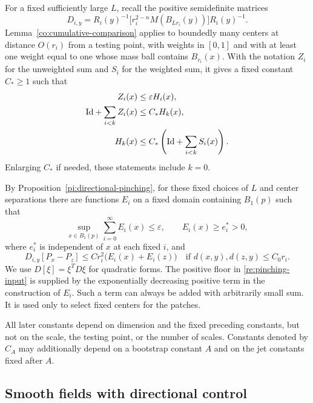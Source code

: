 For a fixed sufficiently large $L$, recall the positive semidefinite
matrices
\begin{equation}
 \label{re:patch-matrix}
 D_{i,y}=R_i(y)^{-1}
       \bigl[r_i^{2-n}M(B_{Lr_i}(y))\bigr]R_i(y)^{-1}.
\end{equation}
Lemma~\ref{co:cumulative-comparison} applies to boundedly many
centers at distance $O(r_i)$ from a testing point, with weights in
$[0,1]$ and with at least one weight equal to one whose mass ball contains
$B_{r_i}(x)$.  With the notation $Z_i$ for the unweighted sum and $S_i$
for the weighted sum, it gives a fixed constant $C_*\ge1$ such that
\begin{equation}
 \label{re:cumulative-input}
 \begin{aligned}
 Z_i(x)&\le\varepsilon H_i(x),\\
 \mathrm{Id}+\sum_{i<k}Z_i(x)&\le C_*H_k(x),\\
 H_k(x)&\le C_*\left(\mathrm{Id}+\sum_{i<k}S_i(x)\right).
 \end{aligned}
\end{equation}
Enlarging $C_*$ if needed, these statements include $k=0$.

By Proposition~\ref{pi:directional-pinching}, for these fixed choices
of $L$ and center separations there are functions $E_i$ on a fixed
domain containing $B_1(p)$ such that
\begin{equation}
 \label{re:pinching-input}
 \sup_{x\in B_1(p)}\sum_{i=0}^\infty E_i(x)\le\varepsilon,
 \qquad E_i(x)\ge e_i^*>0,
\end{equation}
where $e_i^*$ is independent of $x$ at each fixed $i$, and
\begin{equation}
 \label{re:directional-input}
 D_{i,y}[P_x-P_z]
       \le C r_i^2\bigl(E_i(x)+E_i(z)\bigr)
 \quad\text{if }d(x,y),d(z,y)\le C_0r_i.
\end{equation}
We use $D[\xi]=\xi^TD\xi$ for quadratic forms.  The positive floor in
\eqref{re:pinching-input} is supplied by the exponentially decreasing
positive term in the construction of $E_i$.  Such a term can always
be added with arbitrarily small sum.  It is used only to select fixed
centers for the patches.

All later constants depend on dimension and the fixed preceding
constants, but not on the scale, the testing point, or the number of
scales.  Constants denoted by $C_A$ may additionally depend on a
bootstrap constant $A$ and on the jet constants fixed after $A$.

\subsection{Smooth fields with directional control}

